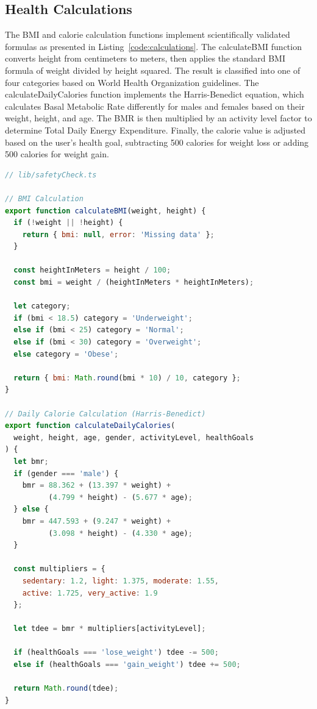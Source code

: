 \subsection{Health Calculations}

The BMI and calorie calculation functions implement scientifically validated formulas as presented in Listing~\ref{code:calculations}. The calculateBMI function converts height from centimeters to meters, then applies the standard BMI formula of weight divided by height squared. The result is classified into one of four categories based on World Health Organization guidelines. The calculateDailyCalories function implements the Harris-Benedict equation, which calculates Basal Metabolic Rate differently for males and females based on their weight, height, and age. The BMR is then multiplied by an activity level factor to determine Total Daily Energy Expenditure. Finally, the calorie value is adjusted based on the user's health goal, subtracting 500 calories for weight loss or adding 500 calories for weight gain.

\begin{lstlisting}[language=JavaScript, caption=BMI and Calorie Calculations, label=code:calculations]
// lib/safetyCheck.ts

// BMI Calculation
export function calculateBMI(weight, height) {
  if (!weight || !height) {
    return { bmi: null, error: 'Missing data' };
  }
  
  const heightInMeters = height / 100;
  const bmi = weight / (heightInMeters * heightInMeters);
  
  let category;
  if (bmi < 18.5) category = 'Underweight';
  else if (bmi < 25) category = 'Normal';
  else if (bmi < 30) category = 'Overweight';
  else category = 'Obese';
  
  return { bmi: Math.round(bmi * 10) / 10, category };
}

// Daily Calorie Calculation (Harris-Benedict)
export function calculateDailyCalories(
  weight, height, age, gender, activityLevel, healthGoals
) {
  let bmr;
  if (gender === 'male') {
    bmr = 88.362 + (13.397 * weight) + 
          (4.799 * height) - (5.677 * age);
  } else {
    bmr = 447.593 + (9.247 * weight) + 
          (3.098 * height) - (4.330 * age);
  }
  
  const multipliers = {
    sedentary: 1.2, light: 1.375, moderate: 1.55,
    active: 1.725, very_active: 1.9
  };
  
  let tdee = bmr * multipliers[activityLevel];
  
  if (healthGoals === 'lose_weight') tdee -= 500;
  else if (healthGoals === 'gain_weight') tdee += 500;
  
  return Math.round(tdee);
}
\end{lstlisting}


